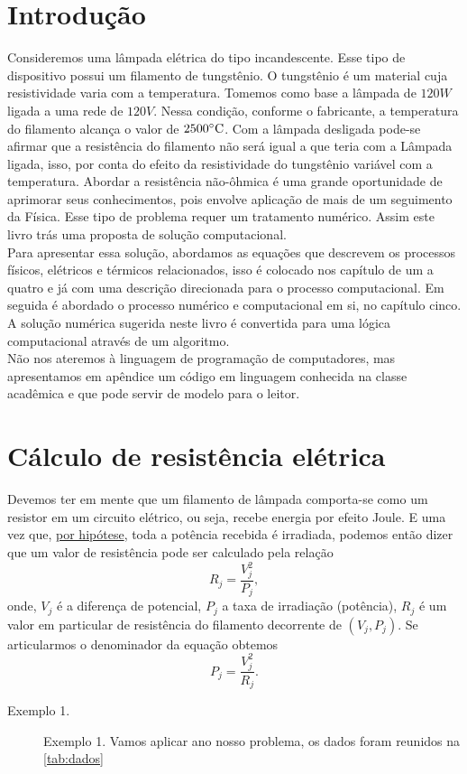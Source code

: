 \documentclass[12pt]{article}
\begin{document}
\section{Introdução}
Consideremos uma lâmpada elétrica do tipo incandescente. Esse tipo de dispositivo possui um filamento de tungstênio. O tungstênio é um material cuja resistividade varia com a temperatura. Tomemos como base a lâmpada de $120W$ ligada a uma rede de $120V$. Nessa condição, conforme o fabricante, a temperatura do filamento alcança o valor de $2500\celsius$. Com a lâmpada desligada pode-se afirmar que a resistência do filamento não será igual a que teria com a Lâmpada ligada, isso, por conta do efeito da resistividade do tungstênio variável com a temperatura.
Abordar a resistência não-ôhmica é uma grande oportunidade de aprimorar seus conhecimentos, pois envolve aplicação de mais de um seguimento da Física. Esse tipo de problema requer um tratamento numérico. Assim este livro trás uma proposta de solução computacional.\\ Para apresentar essa solução, abordamos as equações que descrevem os processos físicos, elétricos e térmicos relacionados, isso é colocado nos capítulo de um a quatro e já com uma descrição direcionada para o processo computacional. Em seguida é abordado o processo numérico e computacional em si, no capítulo cinco. 
A solução numérica sugerida neste livro é convertida para uma lógica computacional através de um algoritmo. \\   
Não nos ateremos à linguagem de programação de computadores, mas apresentamos em apêndice um código em linguagem conhecida na classe acadêmica e que pode servir de modelo para o leitor.

\section{Cálculo de resistência elétrica}
Devemos ter em mente que um filamento de lâmpada comporta-se como um resistor em um circuito elétrico, ou seja, recebe energia por efeito Joule. E uma vez que, \uline{por hipótese}, toda a potência recebida é irradiada, podemos então dizer que um valor de resistência pode ser calculado pela relação
\begin{equation}
    R_j=\frac{V_j^2}{P_j},
    \label{eq:R_j}
\end{equation}
onde, $V_j$ é a diferença de potencial, $P_j$ a taxa de irradiação (potência), $R_j$ é um valor em particular de resistência do filamento decorrente de $(V_j, P_j)$.
Se articularmos o denominador da equação obtemos
\begin{equation}
    P_j=\frac{V^2_{j}}{R_j}.
    \label{eq:P=V/R}
\end{equation}
\begin{description}
\item[Exemplo 1.]
Exemplo 1.	Vamos aplicar ano nosso problema, os dados foram reunidos na \ref{tab:dados} 
\end{description}
\end{document}
